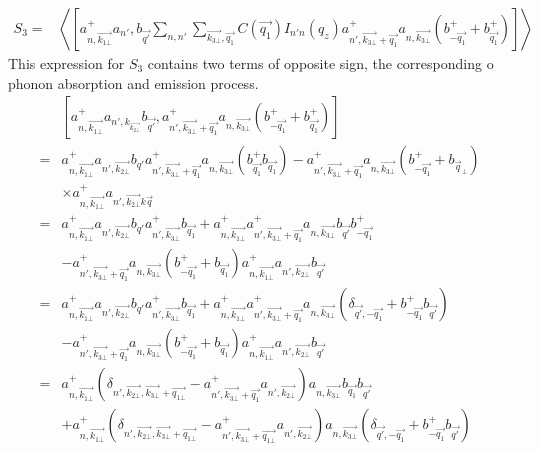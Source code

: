 \documentclass{article}
\begin{document}
\begin{align*}
        S_3 = & \left \langle \left[a^+_{n,\vec{k_{1\bot}}}a_{n'},b_{\vec{q'}} \sum_{n,n'}\sum_{\vec{k_{3\bot}},\vec{q_1}}C\left(\vec{q_1}\right)I_{n'n}\left(q_z\right) a^+_{n', \vec{k_{3\bot}}+\vec{q_1}}a_{n, \vec{k_{3\bot}}}\left(b^+_{-\vec{q_1}}+ b^+_{\vec{q_1}}\right)\right] \right \rangle
\end{align*}
This expression for $S_3$ contains two terms of opposite sign, the corresponding o phonon absorption and emission process.
\begin{align*}
    & \left[a^+_{n,\vec{k_{1\bot}}}a_{n',k_{\vec{k_{2\bot}}}}b_{\vec{q'}},a^+_{n', \vec{k_{3\bot}}+ \vec{q_1}} a_{n,\vec{k_{3\bot}}}\left(b^+_{-\vec{q_1}}+ b^+_{\vec{q_1}}\right)\right] \\
     = & a^+_{n, \vec{k_{1\bot}}}a_{n',\vec{k_{2\bot}}}b_{q'}a^+_{n', \vec{k_{3\bot}}+\vec{q_1}}a_{n, \vec{k_{3\bot}}}\left(b^+_{ \vec{q_1}}b_{\vec{q_1}}\right) - a^+_{n', \vec{k_{3\bot}}+ \vec{q_1}}a_{n, \vec{k_{3\bot}}}\left(b^+_{-\vec{q_1}}+ b_{\vec{q}_{\bot}}\right) \\
    & \times a^+_{n, \vec{k_{1\bot}}}a_{n', \vec{k_{2\bot}} k \vec{q}}\\
  = & a^+_{n, \vec{k_{1\bot}}}a_{n',\vec{k_{2\bot}}}b_{q'}a^+_{n', \vec{k_{3\bot}}}b_{\vec{q_1}}+a^+_{n,\vec{k_{1\bot}}}a^+_{n', \vec{k_{3\bot}}+ \vec{q_1}}a_{n,\vec{k_{3\bot}}}b_{\vec{q'}}b^+_{-\vec{q_1}}\\
     & - a^+_{n', \vec{k_{3\bot}} + \vec{q_1}}a_{n,\vec{k_{3\bot}}} \left(b^+_{-\vec{q_1}}+b_{\vec{q_1}}\right) a^+_{n, \vec{k_{1\bot}}}a_{n', \vec{k_{2\bot}}}b_{\vec{q'}}\\
     = & a^+_{n, \vec{k_{1\bot}}}a_{n',\vec{k_{2\bot}}}b_{q'}a^+_{n', \vec{k_{3\bot}}}b_{\vec{q_1}}+a^+_{n,\vec{k_{1\bot}}}a^+_{n', \vec{k_{3\bot}}+ \vec{q_1}}a_{n,\vec{k_{3\bot}}}\left(\delta_{\vec{q'},-\vec{q_1}}+b^+_{-\vec{q_1}}b_{\vec{q'}} \right)\\
     & - a^+_{n', \vec{k_{3\bot}} + \vec{q_1}}a_{n, \vec{k_{3\bot}}} \left(b^+_{-\vec{q_1}}+b_{\vec{q_1}}\right) a^+_{n, \vec{k_{1\bot}}}a_{n', \vec{k_{2\bot}}}b_{\vec{q'}}\\
    = & a^+_{n, \vec{k_{1\bot}}} \left(\delta_{n', \vec{k_{2\bot}}, \vec{k_{3\bot}}+ \vec{q_{1\bot}}}-a^+_{n', \vec{k_{3\bot}}+\vec{q_1}}a_{n',\vec{k_{2\bot}}}\right)a_{n, \vec{k_{3\bot}}}b_{\vec{q_1}}b_{\vec{q'}} \\
    & + a^+_{n, \vec{k_{1\bot}}} \left(\delta_{n', \vec{k_{2\bot}}, \vec{k_{3\bot}}+ \vec{q_{1\bot}}}- a^+_{n', \vec{k_{3\bot}}+\vec{q_{1\bot}}}a_{n',\vec{k_{2\bot}}}\right)a_{n, \vec{k_{3\bot}}}\left(\delta_{\vec{q'},-\vec{q_1}}+b^+_{-\vec{q_1}}b_{\vec{q'}}\right) \\
\end{align*}
\end{document}
